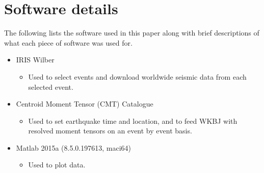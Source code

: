 \documentclass[11pt,a4paper]{article}
\begin{document}
\section{Software details}
\label{app:Software}
The following lists the software used in this paper along with brief descriptions of what each piece of software was used for.
\begin{itemize}
	\item IRIS Wilber
	\begin{itemize}
		\item Used to select events and download worldwide seismic data from each selected event.
	\end{itemize}
	\item Centroid Moment Tensor (CMT) Catalogue
	\begin{itemize}
		\item Used to set earthquake time and location, and to feed WKBJ with resolved moment tensors on an event by event basis.
	\end{itemize}
	\item Matlab 2015a (8.5.0.197613, maci64)
	\begin{itemize}
		\item Used to plot data.
	\end{itemize}
\end{itemize}

\newpage


\end{document}
